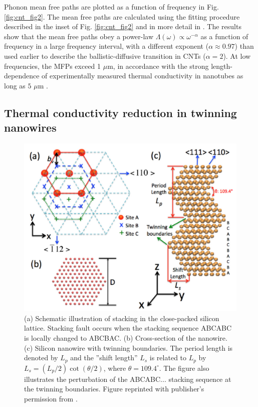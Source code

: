 Phonon mean free paths are plotted as a function of frequency in Fig. \ref{fig:cnt_fig2}. The mean free paths are calculated using the fitting procedure described in the inset of Fig. \ref{fig:cnt_fig2} and in more detail in . The results show that the mean free paths obey a power-law $\Lambda(\omega)\propto \omega^{-\alpha}$ as a function of frequency in a large frequency interval, with a different exponent ($\alpha\approx 0.97$) than used earlier \cite{wang06_apl} to describe the ballistic-diffusive transition in CNTs ($\alpha=2$). At low frequencies, the MFPs exceed 1 $\mu$m, in accordance with the strong length-dependence of experimentally measured thermal conductivity in nanotubes as long as $5$ $\mu$m \cite{chang08}.

\subsection{Thermal conductivity reduction in twinning nanowires}

\label{sec:results_twinning}

\begin{figure}[tb]
 \begin{center}
  \includegraphics[width=.89\columnwidth]{pics/twinning_fig1.pdf} 
  \caption{(a) Schematic illustration of stacking in the close-packed silicon lattice. Stacking fault occurs when the stacking sequence ABCABC is locally changed to ABCBAC. (b) Cross-section of the nanowire. (c) Silicon nanowire with twinning boundaries. The period length is denoted by $L_p$ and the ''shift length'' $L_s$ is related to $L_p$ by $L_s=(L_p/2)\cot(\theta/2)$, where $\theta=109.4^{\circ}$. The figure also illustrates the perturbation of the ABCABC... stacking sequence at the twinning boundaries. Figure reprinted with publisher's permission from .}  
\label{fig:twinning_fig1}
 \end{center}
\end{figure}

